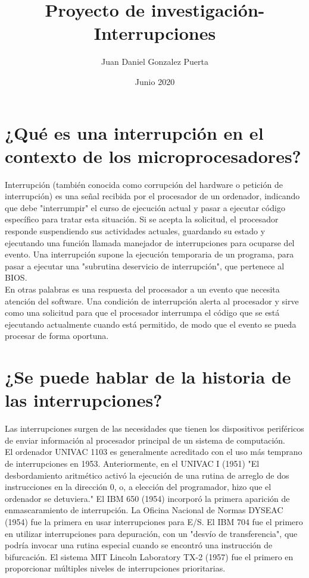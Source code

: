 \documentclass{article}
\title{Proyecto de investigación-Interrupciones}
\author{Juan Daniel Gonzalez Puerta}
\date{Junio 2020}
\begin{document}
\maketitle

\section*{¿Qué es una interrupción en el contexto de los microprocesadores?}
Interrupción (también conocida como corrupción del hardware o petición de interrupción) es una señal recibida por el procesador de un ordenador, indicando que debe "interrumpir" el curso de ejecución actual y pasar a ejecutar código específico para tratar esta situación. Si se acepta la solicitud, el procesador responde suspendiendo sus actividades actuales, guardando su estado y ejecutando una función llamada manejador de interrupciones para ocuparse del evento. Una interrupción supone la ejecución temporaria de un programa, para pasar a ejecutar una "subrutina deservicio de interrupción", que pertenece al BIOS.\\

En otras palabras es una respuesta del procesador a un evento que necesita atención del software. Una condición de interrupción alerta al procesador y sirve como una solicitud para que el procesador interrumpa el código que se está ejecutando actualmente cuando está permitido, de modo que el evento se pueda procesar de forma oportuna.

\section*{¿Se puede hablar de la historia de las interrupciones?}
Las interrupciones surgen de las necesidades que tienen los dispositivos periféricos de enviar información al procesador principal de un sistema de computación.\\

El ordenador UNIVAC 1103 es generalmente acreditado con el uso más temprano de interrupciones en 1953. Anteriormente, en el UNIVAC I (1951) "El desbordamiento aritmético activó la ejecución de una rutina de arreglo de dos instrucciones en la dirección 0, o, a elección del programador, hizo que el ordenador se detuviera." El IBM 650 (1954) incorporó la primera aparición de enmascaramiento de interrupción. La Oficina Nacional de Normas DYSEAC (1954) fue la primera en usar interrupciones para E/S. El IBM 704 fue el primero en utilizar interrupciones para depuración, con un "desvío de transferencia", que podría invocar una rutina especial cuando se encontró una instrucción de bifurcación. El sistema MIT Lincoln Laboratory TX-2 (1957) fue el primero en proporcionar múltiples niveles de interrupciones prioritarias. 
\end{document}
